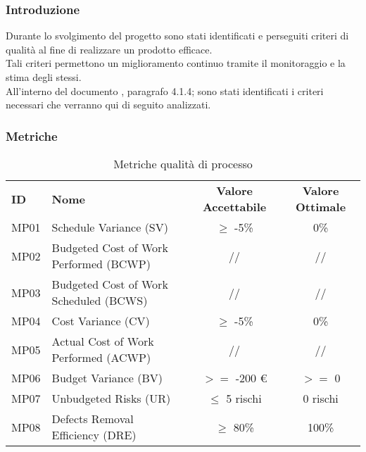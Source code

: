 

\subsubsection{Introduzione}
Durante lo svolgimento del progetto sono stati identificati e perseguiti criteri di qualità al fine di realizzare un prodotto efficace. \\
Tali criteri permettono un miglioramento continuo tramite il monitoraggio e la stima degli stessi.\\
All'interno del documento , paragrafo 4.1.4; sono stati identificati i criteri necessari che verranno qui di seguito analizzati.
\subsubsection{Metriche}

\begin{table} [h!]
	\begin{center}
		\begin{tabular} {m{2 cm} m{7 cm} c c }
			\rowcolor{lightgray}
			\textbf{ID} & \textbf{Nome}& \textbf{Valore Accettabile} & \textbf{Valore Ottimale}\\
			MP01 & Schedule Variance (SV)   & $\geq$ -5\%    & 0\% \\
			MP02 & Budgeted Cost of Work Performed (BCWP) & //           & // \\
			MP03 & Budgeted Cost of Work Scheduled (BCWS) & //           & // \\
			MP04 & Cost Variance (CV)   & $\geq$ -5\% & 0\% \\
			MP05 & Actual Cost of Work Performed (ACWP) & //           & // \\
			MP06 & Budget Variance (BV) & $>=$ -200 \euro & $>=$ 0 \\
			MP07 & Unbudgeted Risks (UR)   & $\leq$ 5 rischi & 0 rischi\\
			MP08 & Defects Removal Efficiency (DRE)  & $\geq$  80\% & 100\%\\
			

		\end{tabular}
	\caption{Metriche qualità di processo}
	\end{center}
\end{table}
